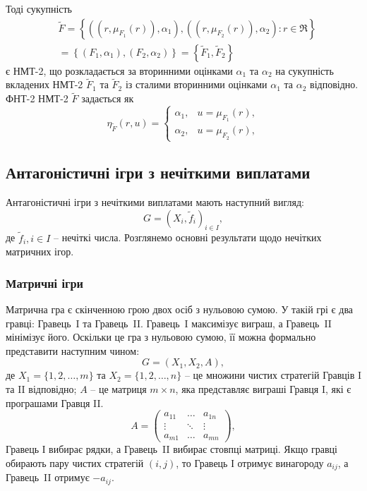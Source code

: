 \documentclass[14pt, a4paper, oneside]{extarticle}
\numberwithin{equation}{section}
\begin{document}
Тоді сукупність
\begin{align*}
    &\tilde{F} = \left\{\left(\left(r, \mu_{F_{1}}(r)\right), \alpha_{1}\right), \left(\left(r, \mu_{F_{2}}(r)\right), \alpha_{2}\right): r \in \Re\right\} \\
    &= \left\{\left(F_{1}, \alpha_{1}\right), \left(F_{2}, \alpha_{2}\right)\right\} = \left\{\tilde{F}_{1}, \tilde{F}_{2}\right\}
\end{align*}
є НМТ-2, що розкладається за вторинними оцінками $\alpha_{1}$ та $\alpha_{2}$ на сукупність вкладених НМТ-2 $\tilde{F}_{1}$ та $\tilde{F}_{2}$ із сталими вторинними оцінками $\alpha_{1}$ та $\alpha_{2}$ відповідно. ФНТ-2 НМТ-2 $\tilde{F}$ задається як
\begin{equation*}
\eta_{\tilde{F}}(r, u)= \begin{cases}\alpha_{1}, & u=\mu_{F_{1}}(r), \\ \alpha_{2}, & u=\mu_{F_{2}}(r) ,\end{cases}
\end{equation*}

\subsection{Антагоністичні ігри з нечіткими виплатами}
Антагоністичні ігри з нечіткими виплатами мають наступний вигляд:
\begin{equation*}
G=\left(X_{i}, \tilde{f}_{i} \right)_{i \in I},
\end{equation*}
де $\tilde{f}_{i}, i \in I$ -- нечіткі числа. Розглянемо основні результати щодо нечітких матричних ігор.\cite{Larbani}

\subsubsection{Матричні ігри}
Матрична гра є скінченною грою двох осіб з нульовою сумою. У такій грі є два гравці: Гравець~I та Гравець~II. Гравець~I максимізує виграш, а Гравець~II мінімізує його. Оскільки це гра з нульовою сумою, її можна формально представити наступним чином:
\begin{equation*}
G=\left(X_{1}, X_{2}, A\right),
\end{equation*}
де $X_{1}=\{1,2, \ldots, m\}$ та $X_{2}=\{1,2, \ldots, n\}$ -- це множини чистих стратегій Гравців I та II відповідно; $A$ -- це матриця $m \times n$, яка представляє виграші Гравця I, які є програшами Гравця II.
\begin{equation*}
A=\left(\begin{array}{lll}
a_{11} & \ldots & a_{1 n} \\
\vdots & \ddots & \vdots \\
a_{m 1} & \ldots & a_{m n}
\end{array}\right),
\end{equation*}
Гравець І вибирає рядки, а Гравець~II вибирає стовпці матриці. Якщо гравці обирають пару чистих стратегій $(i, j)$, то Гравець І отримує винагороду $a_{i j}$, а Гравець~II отримує $-a_{i j}$.
\end{document}
